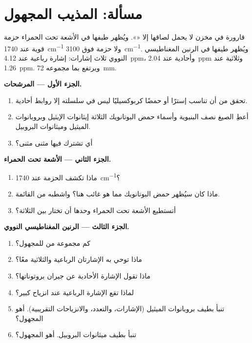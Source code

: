 \section{مسألة: المذيب المجهول}

\begin{problem}
\label{pb:g12:proton-nmr:1}
قارورة  في مخزن لا يحمل لصاقها إلا «». ويُظهر
طيفها في الأشعة تحت الحمراء حزمة قوية عند \qty{1740}{cm^{-1}} ولا حزمة
فوق \qty{3100}{cm^{-1}}. ويُظهر طيفها في الرنين المغناطيسي النووي ثلاث إشارات: إشارة
رباعية عند \qty{4.12}{ppm}، وأحادية عند \qty{2.04}{ppm} وثلاثية عند
\qty{1.26}{ppm}. ويرتفع  بما مجموعه \qty{72}{mm}.

\medskip
\noindent\textbf{الجزء الأول --- المرشحات.}
\begin{enumerate}
  \item تحقق من أن  تناسب إسترًا أو حمضًا كربوكسيليًا ليس في
        سلسلته إلا روابط أحادية.
  \item أعطِ الصيغ نصف البنيوية وأسماء حمض البوتانويك
         الثلاثة إيثانوات الإيثيل وبروبانوات الميثيل وميثانوات
        البروبيل.
  \item أي  تشترك فيها مثنى مثنى؟
\end{enumerate}

\medskip
\noindent\textbf{الجزء الثاني --- الأشعة تحت الحمراء.}
\begin{enumerate}[resume]
  \item ماذا تكشف الحزمة عند \qty{1740}{cm^{-1}}؟
  \item ماذا كان سيُظهر حمض البوتانويك مما هو غائب هنا؟ واشطبه
        من القائمة.
  \item أتستطيع الأشعة تحت الحمراء وحدها أن تختار بين  الثلاثة؟
\end{enumerate}

\medskip
\noindent\textbf{الجزء الثالث --- الرنين المغناطيسي النووي.}
\begin{enumerate}[resume]
  \item كم مجموعة من  للمجهول؟
  \item ماذا توحي به الإشارتان الرباعية والثلاثية معًا؟
  \item ماذا تقول الإشارة الأحادية عن جيران بروتوناتها؟
  \item لماذا تقع الإشارة الرباعية عند انزياح كبير؟
  \item تنبأ بطيف بروبانوات الميثيل 
        (الإشارات، والتعدد، والانزياحات التقريبية). أهو المجهول؟
  \item تنبأ بطيف ميثانوات البروبيل. أهو المجهول؟
\end{enumerate}


\end{problem}
